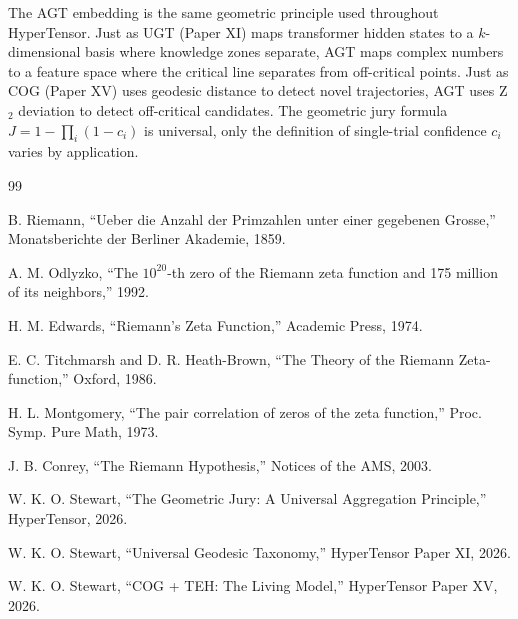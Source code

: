 \documentclass[11pt,a4paper]{article}
\begin{document}
The AGT embedding is the same geometric principle used throughout HyperTensor. Just as UGT (Paper XI) maps transformer hidden states to a $k$-dimensional basis where knowledge zones separate, AGT maps complex numbers to a feature space where the critical line separates from off-critical points. Just as COG (Paper XV) uses geodesic distance to detect novel trajectories, AGT uses Z$_2$ deviation to detect off-critical candidates. The geometric jury formula $J = 1 - \prod_i (1-c_i)$ is universal, only the definition of single-trial confidence $c_i$ varies by application.

\begin{thebibliography}{99}

 B. Riemann, ``Ueber die Anzahl der Primzahlen unter einer gegebenen Grosse,'' Monatsberichte der Berliner Akademie, 1859.

 A. M. Odlyzko, ``The $10^{20}$-th zero of the Riemann zeta function and 175 million of its neighbors,'' 1992.

 H. M. Edwards, ``Riemann's Zeta Function,'' Academic Press, 1974.

 E. C. Titchmarsh and D. R. Heath-Brown, ``The Theory of the Riemann Zeta-function,'' Oxford, 1986.

 H. L. Montgomery, ``The pair correlation of zeros of the zeta function,'' Proc. Symp. Pure Math, 1973.

 J. B. Conrey, ``The Riemann Hypothesis,'' Notices of the AMS, 2003.

 W. K. O. Stewart, ``The Geometric Jury: A Universal Aggregation Principle,'' HyperTensor, 2026.

 W. K. O. Stewart, ``Universal Geodesic Taxonomy,'' HyperTensor Paper XI, 2026.

 W. K. O. Stewart, ``COG + TEH: The Living Model,'' HyperTensor Paper XV, 2026.

\end{thebibliography}
\end{document}
